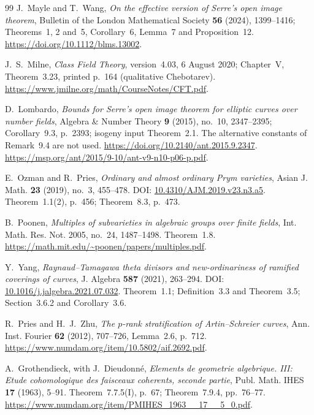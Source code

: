 \begin{thebibliography}{99}
J.~Mayle and T.~Wang, \emph{On the effective version of Serre's
open image theorem}, Bulletin of the London Mathematical Society
\textbf{56} (2024), 1399--1416; Theorems~1, 2 and~5,
Corollary~6, Lemma~7 and Proposition~12.
\url{https://doi.org/10.1112/blms.13002}.

J.~S.~Milne, \emph{Class Field Theory}, version~4.03,
6 August 2020; Chapter~V, Theorem~3.23, printed p.~164
(qualitative Chebotarev).
\url{https://www.jmilne.org/math/CourseNotes/CFT.pdf}.

D.~Lombardo, \emph{Bounds for Serre's open image theorem for elliptic
curves over number fields}, Algebra \& Number Theory \textbf{9}
(2015), no.~10, 2347--2395; Corollary~9.3, p.~2393;
isogeny input Theorem~2.1. The alternative constants of Remark~9.4
are not used.
\url{https://doi.org/10.2140/ant.2015.9.2347}.
\url{https://msp.org/ant/2015/9-10/ant-v9-n10-p06-p.pdf}.

E.~Ozman and R.~Pries,
\emph{Ordinary and almost ordinary Prym varieties},
Asian J. Math. \textbf{23} (2019), no.~3, 455--478.
DOI: \href{https://doi.org/10.4310/AJM.2019.v23.n3.a5}{10.4310/AJM.2019.v23.n3.a5}.
Theorem~1.1(2), p.~456; Theorem~8.3, p.~473.

B.~Poonen,
\emph{Multiples of subvarieties in algebraic groups over finite fields},
Int. Math. Res. Not. 2005, no.~24, 1487--1498.
Theorem~1.8.
\url{https://math.mit.edu/~poonen/papers/multiples.pdf}.

Y.~Yang,
\emph{Raynaud--Tamagawa theta divisors and new-ordinariness of
ramified coverings of curves},
J. Algebra \textbf{587} (2021), 263--294.
DOI: \href{https://doi.org/10.1016/j.jalgebra.2021.07.032}{10.1016/j.jalgebra.2021.07.032}.
Theorem~1.1; Definition~3.3 and Theorem~3.5;
Section~3.6.2 and Corollary~3.6.

R.~Pries and H.~J.~Zhu, \emph{The $p$-rank stratification of
Artin--Schreier curves}, Ann. Inst. Fourier \textbf{62} (2012),
707--726, Lemma~2.6, p.~712.
\url{https://www.numdam.org/item/10.5802/aif.2692.pdf}.

A.~Grothendieck, with J.~Dieudonn\'e, \emph{Elements de geometrie
algebrique. III: Etude cohomologique des faisceaux coherents,
seconde partie}, Publ. Math. IHES \textbf{17} (1963), 5--91.
Theorem~7.7.5(I), p.~67; Theorem~7.9.4, pp.~76--77.
\url{https://www.numdam.org/item/PMIHES_1963__17__5_0.pdf}.


\end{thebibliography}
